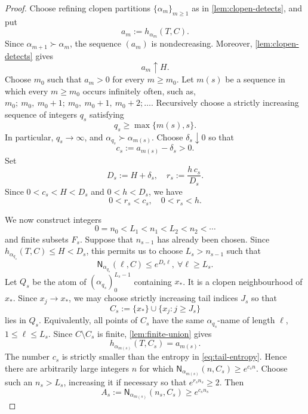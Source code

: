 \documentclass[10pt,a4paper]{amsart}
\newcommand{\Nname}{\mathsf N}
\numberwithin{equation}{section}
\begin{document}
	\begin{proof}
		Choose refining clopen partitions $\{\alpha_m\}_{m\geq1}$ as in
		\cref{lem:clopen-detects}, and put
		\[
		a_m:=h_{\alpha_m}(T,C).
		\]
		Since $\alpha_{m+1}\succ \alpha_m$, the sequence $(a_m)$ is
		nondecreasing.  Moreover, \cref{lem:clopen-detects} gives
		\begin{equation}
			a_m\uparrow H.
			\label{eq:am-to-H}
		\end{equation}
		Choose $m_0$ such that $a_m>0$ for every $m\geq m_0$.  Let $m(s)$ be a
		sequence in which every $m\geq m_0$ occurs infinitely often, such as, $m_0;~m_0,~ m_0+1;~ m_0,~ m_0+1,~ m_0+2; \dots$.  Recursively
		choose a strictly increasing sequence of integers $q_s$ satisfying
		\begin{equation}
			q_s\geq\max\{m(s),s\}.
			\label{eq:qs-choice}
		\end{equation}
		In particular, $q_s\to\infty$, and $\alpha_{q_s}\succ \alpha_{m(s)}$.  Choose $\delta_s\downarrow0$ so that
		\[
		c_s:=a_{m(s)}-\delta_s>0.
		\]
		Set
		\begin{equation}
			D_s:=H+\delta_s,
			\quad
			r_s:=\frac{h\,c_s}{D_s}.
			\label{eq:csr}
		\end{equation}
		Since $0<c_s<H<D_s$ and $0<h<D_s$, we have
		\begin{equation}
			0<r_s<c_s,
			\quad 0<r_s<h.
			\label{eq:rs-bounds}
		\end{equation}
		
		We now construct integers
		\[
		0=n_0<L_1<n_1<L_2<n_2<\cdots
		\]
		and finite subsets $F_s$.  Suppose that $n_{s-1}$ has already been
		chosen.  Since $h_{\alpha_{q_s}}(T,C)\leq H<D_s$, this permits us to choose $L_s>n_{s-1}$ such that
		\begin{equation}
			\Nname_{\alpha_{q_s}}(\ell,C)
			\leq e^{D_s\ell},~ \forall\ell\geq L_s.
			\label{eq:fine-upper}
		\end{equation}
		Let $Q_s$ be the atom of $(\alpha_{q_s})_0^{L_s-1}$ containing $x_*$.  It
		is a clopen neighbourhood of $x_*$.  Since $x_j\to x_*$, we may choose
		strictly increasing tail indices $J_s$ so that
		\[
		C_s:=\{x_*\}\cup\{x_j:j\geq J_s\}
		\]
		lies in $Q_s$.  Equivalently, all points of $C_s$ have the same
		$\alpha_{q_s}$-name of length $\ell$, $1\leq \ell\leq L_s$.  Since $C\setminus C_s$ is
		finite, \cref{lem:finite-union} gives
		\begin{equation}
			h_{\alpha_{m(s)}}(T,C_s)=a_{m(s)}.
			\label{eq:tail-entropy}
		\end{equation}
		The number $c_s$ is strictly smaller than the entropy in
		\eqref{eq:tail-entropy}.  Hence there are arbitrarily large integers $n$
		for which $\Nname_{\alpha_{m(s)}}(n,C_s)\geq e^{c_sn}$.  Choose such an
		$n_s>L_s$, increasing it if necessary so that $e^{r_sn_s}\geq2$.  Then
		\begin{equation}
			A_s:=\Nname_{\alpha_{m(s)}}(n_s,C_s)
			\geq e^{c_sn_s}
			\label{eq:coarse-lower}
		\end{equation}
		

\end{proof}
\end{document}
